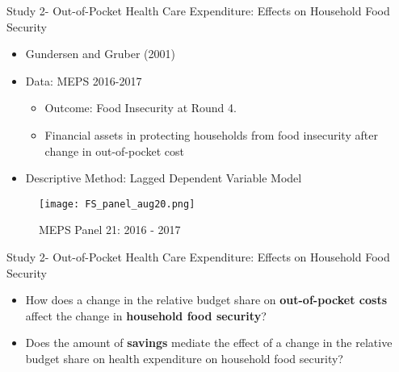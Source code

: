 \documentclass[t, hyperref={colorlinks=true}, compress]{beamer}
\begin{document}
\begin{frame}{Study 2- Out-of-Pocket Health Care Expenditure: Effects on Household Food Security}
\centering
\begin{itemize}
\item Gundersen and Gruber (2001)
\item Data: MEPS 2016-2017
\begin{itemize}
\item Outcome: Food Insecurity at Round 4.
\smallskip
\item Financial assets in protecting households from food insecurity after change in out-of-pocket cost
\end{itemize}
\item Descriptive Method: Lagged Dependent Variable Model  
\end{itemize}
\begin{figure}
    \centering
\texttt{[image: FS\_panel\_aug20.png]}
    \caption{MEPS Panel 21: 2016 - 2017}\label{FS_panel}
\end{figure}
\end{frame}

\begin{frame}{Study 2- Out-of-Pocket Health Care Expenditure: Effects on Household Food Security} 
\begin{itemize}
\item How does a change in the relative budget share on \textbf{out-of-pocket costs} affect the change in \textbf{household food security}? 
\bigskip 
\bigskip 
\item Does the amount of \textbf{savings} mediate the effect of a change in the relative budget share on health expenditure on household food security?  
\end{itemize}

\end{frame}
\end{document}
